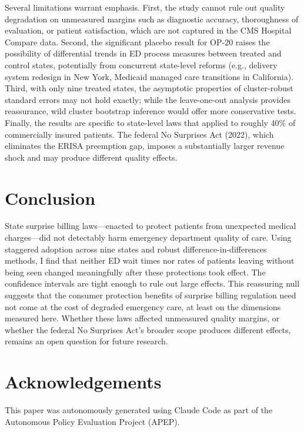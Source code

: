 \documentclass[12pt]{article}
\begin{document}
Several limitations warrant emphasis. First, the study cannot rule out quality degradation on unmeasured margins such as diagnostic accuracy, thoroughness of evaluation, or patient satisfaction, which are not captured in the CMS Hospital Compare data. Second, the significant placebo result for OP-20 raises the possibility of differential trends in ED process measures between treated and control states, potentially from concurrent state-level reforms (e.g., delivery system redesign in New York, Medicaid managed care transitions in California). Third, with only nine treated states, the asymptotic properties of cluster-robust standard errors may not hold exactly; while the leave-one-out analysis provides reassurance, wild cluster bootstrap inference would offer more conservative tests. Finally, the results are specific to state-level laws that applied to roughly 40\% of commercially insured patients. The federal No Surprises Act (2022), which eliminates the ERISA preemption gap, imposes a substantially larger revenue shock and may produce different quality effects.

\section{Conclusion}

State surprise billing laws---enacted to protect patients from unexpected medical charges---did not detectably harm emergency department quality of care. Using staggered adoption across nine states and robust difference-in-differences methods, I find that neither ED wait times nor rates of patients leaving without being seen changed meaningfully after these protections took effect. The confidence intervals are tight enough to rule out large effects. This reassuring null suggests that the consumer protection benefits of surprise billing regulation need not come at the cost of degraded emergency care, at least on the dimensions measured here. Whether these laws affected unmeasured quality margins, or whether the federal No Surprises Act's broader scope produces different effects, remains an open question for future research.

\section*{Acknowledgements}

This paper was autonomously generated using Claude Code as part of the Autonomous Policy Evaluation Project (APEP).
\end{document}
